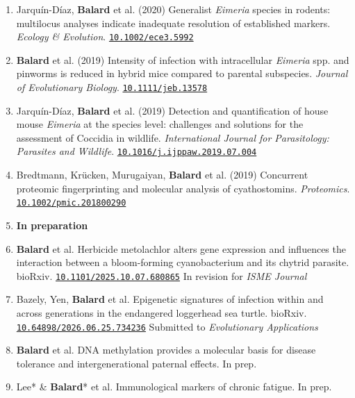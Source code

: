 \documentclass[letterpaper,12pt,oneside]{article}
\newcommand{\doi}[1]{\href{https://doi.org/#1}{\nolinkurl{#1}}}
\begin{document}
{\begin{enumerate}
     \item Jarqu\'in-D\'iaz, \textbf{Balard} et al. (2020) Generalist \textit{Eimeria} species in rodents: multilocus analyses indicate inadequate resolution of established markers. \textit{Ecology \& Evolution}. \doi{10.1002/ece3.5992}

    \item \textbf{Balard} et al. (2019) Intensity of infection with intracellular \textit{Eimeria} spp. and pinworms is reduced in hybrid mice compared to parental subspecies. \textit{Journal of Evolutionary Biology}. \doi{10.1111/jeb.13578}

    \item Jarqu\'in-D\'iaz, \textbf{Balard} et al. (2019) Detection and quantification of house mouse \textit{Eimeria} at the species level: challenges and solutions for the assessment of Coccidia in wildlife. \textit{International Journal for Parasitology: Parasites and Wildlife}. \doi{10.1016/j.ijppaw.2019.07.004}

    \item Bredtmann, Kr\"ucken, Murugaiyan, \textbf{Balard} et al. (2019) Concurrent proteomic fingerprinting and molecular analysis of cyathostomins. \textit{Proteomics}. \doi{10.1002/pmic.201800290}

    \item[] \vspace{0.3em}\textcolor{Apricot}{\textbf{In preparation}}\vspace{0.2em}

    \item[] \textbf{Balard} et al. Herbicide metolachlor alters gene expression and influences the interaction between a bloom-forming cyanobacterium and its chytrid parasite. bioRxiv. \doi{10.1101/2025.10.07.680865} In revision for \textit{ISME Journal}

    \item[] Bazely, Yen, \textbf{Balard} et al. Epigenetic signatures of infection within and across generations in the endangered loggerhead sea turtle. bioRxiv. \doi{10.64898/2026.06.25.734236} Submitted to \textit{Evolutionary Applications}

    \item[] \textbf{Balard} et al. DNA methylation provides a molecular basis for disease tolerance and intergenerational paternal effects. In prep.

    \item[] Lee* \& \textbf{Balard}* et al. Immunological markers of chronic fatigue. In prep.\\[0.2em]

     \end{enumerate}
     }
\end{document}
